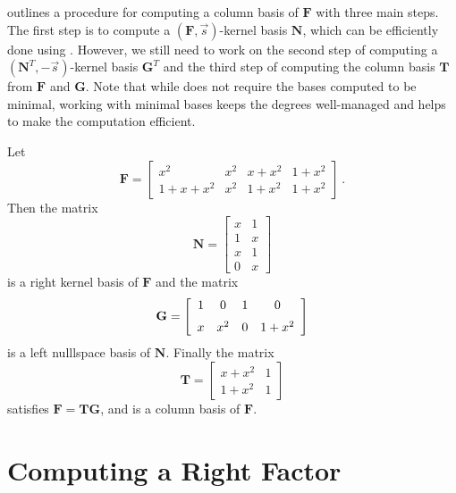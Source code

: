  outlines a procedure for computing a column
basis of $\mathbf{F}$ with three main steps. The first step is to
compute a $\left(\mathbf{F},\vec{s}\right)$-kernel basis $\mathbf{N}$,
which can be efficiently done using .
However, we still need to work on the second step of computing a $\left(\mathbf{N}^{T},-\vec{s}\right)$-kernel
basis $\mathbf{G}^{T}$ and the third step of computing the column
basis $\mathbf{T}$ from $\mathbf{F}$ and $\mathbf{G}$. Note that
while  does not require the bases computed
to be minimal, working with minimal bases keeps the degrees well-managed
and helps to make the computation efficient.
\begin{example}
Let 
\[
\mathbf{F}=\left[\begin{array}{cccc}
x^{2} & x^{2} & x+x^{2} & 1+x^{2}\\
1+x+x^{2} & x^{2} & 1+x^{2} & 1+x^{2}
\end{array}\right]~.
\]
Then the matrix 
\[
\mathbf{N}=\left[\begin{array}{cc}
x & 1\\
1 & x\\
x & 1\\
0 & x
\end{array}\right]
\]
is a right kernel basis of $\mathbf{F}$ and the matrix 
\[
\mathbf{G}=\left[\begin{array}{cccc}
1 & 0 & 1 & 0\\
\noalign{\medskip}x & {x}^{2} & 0 & 1+{x}^{2}
\end{array}\right]
\]
is a left nulllspace basis of $\mathbf{N}$. Finally the matrix 
\[
\mathbf{T}=\left[\begin{array}{cc}
x+x^{2} & 1\\
1+x^{2} & 1
\end{array}\right]
\]
satisfies $\mathbf{F}=\mathbf{T}\mathbf{G}$, and is a column basis
of $\mathbf{F}$. 
\end{example}

\section{\label{sec:computeRightFactor}Computing a Right Factor}

